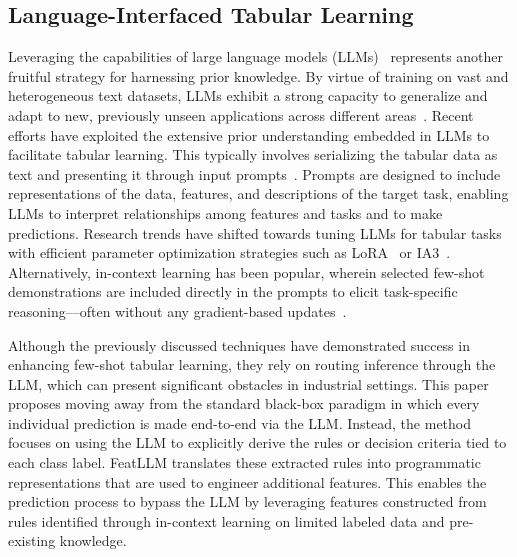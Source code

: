 \subsection{Language-Interfaced Tabular Learning}  
Leveraging the capabilities of large language models (LLMs)~\cite{anil2023palm,openai2023gpt4} represents another fruitful strategy for harnessing prior knowledge. By virtue of training on vast and heterogeneous text datasets, LLMs exhibit a strong capacity to generalize and adapt to new, previously unseen applications across different areas~\cite{brown2020language}. Recent efforts have exploited the extensive prior understanding embedded in LLMs to facilitate tabular learning. This typically involves serializing the tabular data as text and presenting it through input prompts~\cite{dinh2022lift,hegselmann2023tabllm,wang2023anypredict}. Prompts are designed to include representations of the data, features, and descriptions of the target task, enabling LLMs to interpret relationships among features and tasks and to make predictions. Research trends have shifted towards tuning LLMs for tabular tasks with efficient parameter optimization strategies such as LoRA~\cite{hu2021lora} or IA3~\cite{liu2022few}. Alternatively, in-context learning has been popular, wherein selected few-shot demonstrations are included directly in the prompts to elicit task-specific reasoning—often without any gradient-based updates~\cite{dinh2022lift,hegselmann2023tabllm,nam2023semi,slack2023tablet}.

Although the previously discussed techniques have demonstrated success in enhancing few-shot tabular learning, they rely on routing inference through the LLM, which can present significant obstacles in industrial settings. This paper proposes moving away from the standard black-box paradigm in which every individual prediction is made end-to-end via the LLM. Instead, the method focuses on using the LLM to explicitly derive the rules or decision criteria tied to each class label. \textsf{FeatLLM} translates these extracted rules into programmatic representations that are used to engineer additional features. This enables the prediction process to bypass the LLM by leveraging features constructed from rules identified through in-context learning on limited labeled data and pre-existing knowledge.

